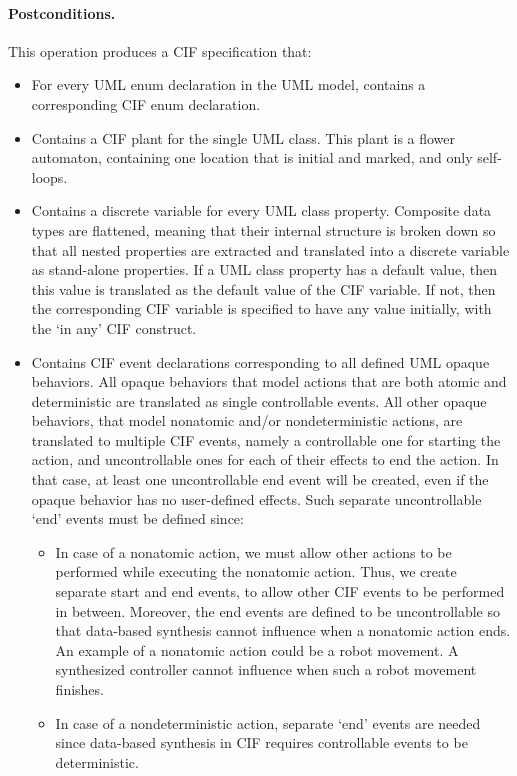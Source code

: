\documentclass{article}
\theoremstyle{definition}
\begin{document}
\paragraph{Postconditions.}
This operation produces a CIF specification that:
\begin{itemize}
	\item For every UML enum declaration in the UML model, contains a corresponding CIF enum declaration.
	\item Contains a CIF plant for the single UML class.
	This plant is a flower automaton, containing one location that is initial and marked, and only self-loops.
	\item Contains a discrete variable for every UML class property.
	Composite data types are flattened, meaning that their internal structure is broken down so that all nested properties are extracted and translated into a discrete variable as stand-alone properties.
	If a UML class property has a default value, then this value is translated as the default value of the CIF variable.
	If not, then the corresponding CIF variable is specified to have any value initially, with the `in any' CIF construct.
	\item Contains CIF event declarations corresponding to all defined UML opaque behaviors.
	All opaque behaviors that model actions that are both atomic and deterministic are translated as single controllable events.
	All other opaque behaviors, that model nonatomic and/or nondeterministic actions, are translated to multiple CIF events, namely a controllable one for starting the action, and uncontrollable ones for each of their effects to end the action.
	In that case, at least one uncontrollable end event will be created, even if the opaque behavior has no user-defined effects.
	Such separate uncontrollable `end' events must be defined since:
	\begin{itemize}
		\item In case of a nonatomic action, we must allow other actions to be performed while executing the nonatomic action.
		Thus, we create separate start and end events, to allow other CIF events to be performed in between.
		Moreover, the end events are defined to be uncontrollable so that data-based synthesis cannot influence when a nonatomic action ends.
		An example of a nonatomic action could be a robot movement.
		A synthesized controller cannot influence when such a robot movement finishes.
		\item In case of a nondeterministic action, separate `end' events are needed since data-based synthesis in CIF requires controllable events to be deterministic.

\end{itemize}
\end{itemize}
\end{document}

